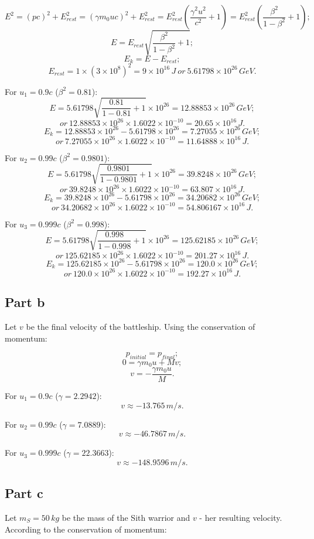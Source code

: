 \documentclass{article}
\begin{document}
\[
E^2 = (pc)^2 + E_{rest}^2 = (\gamma m_0uc)^2 + E_{rest}^2 = E_{rest}^2 (\frac{\gamma ^2 u^2}{c^2} + 1) = E_{rest}^2(\frac{\beta ^2}{1 - \beta ^2} + 1);
\]
\[
E = E_{rest} \sqrt{\frac{\beta ^2}{1 - \beta ^2} + 1};
\]
\[
E_k = E - E_{rest};
\]
\[
E_{rest} = 1 \times (3 \times 10^8)^2 = 9 \times 10^{16}\,J\:or\:5.61798\times10^{26}\,GeV.
\]

For $u_1 = 0.9c$ ($\beta^2 = 0.81$):
\[
E = 5.61798 \sqrt{\frac{0.81}{1-0.81} + 1} \times 10^{26} = 12.88853\times10^{26}\,GeV;
\]
\[
or\:12.88853\times10^{26} \times 1.6022 \times 10^{-10} = 20.65\times10^{16}\,J.
\]
\[
E_k = 12.88853\times10^{26} - 5.61798\times10^{26} = 7.27055\times10^{26}\,GeV;
\]
\[
or\:7.27055\times10^{26} \times 1.6022 \times 10^{-10} = 11.64888\times10^{16}\,J.
\]

For $u_2 = 0.99c$ ($\beta^2 = 0.9801$):
\[
E = 5.61798 \sqrt{\frac{0.9801}{1-0.9801} + 1} \times 10^{26} = 39.8248\times10^{26}\,GeV;
\]
\[
or\:39.8248\times10^{26} \times 1.6022 \times 10^{-10} = 63.807\times10^{16}\,J.
\]
\[
E_k = 39.8248\times10^{26} - 5.61798\times10^{26} = 34.20682\times10^{26}\,GeV;
\]
\[
or\:34.20682\times10^{26} \times 1.6022 \times 10^{-10} = 54.806167\times10^{16}\,J.
\]

For $u_3 = 0.999c$ ($\beta^2 = 0.998$):
\[
E = 5.61798 \sqrt{\frac{0.998}{1-0.998} + 1} \times 10^{26} = 125.62185\times10^{26}\,GeV;
\]
\[
or\:125.62185\times10^{26} \times 1.6022 \times 10^{-10} = 201.27\times10^{16}\,J.
\]
\[
E_k = 125.62185\times10^{26} - 5.61798\times10^{26} = 120.0\times10^{26}\,GeV;
\]
\[
or\:120.0\times10^{26} \times 1.6022 \times 10^{-10} = 192.27\times10^{16}\,J.
\]

\subsection*{Part b}
Let $v$ be the final velocity of the battleship. Using the conservation of momentum:

\[
p_{initial} = p_{final};
\]
\[
0 = \gamma m_0u + Mv;
\]
\[
v = - \frac{\gamma m_0u}{M}.
\]

For $u_1 = 0.9c$ ($\gamma = 2.2942$):
\[
v \approx -13.765\,m/s.
\]

For $u_2 = 0.99c$ ($\gamma = 7.0889$):
\[
v \approx -46.7867\,m/s.
\]

For $u_3 = 0.999c$ ($\gamma = 22.3663$):
\[
v \approx -148.9596\,m/s.
\]

\subsection*{Part c}
Let $m_S = 50\,kg$ be the mass of the Sith warrior and $v$ - her resulting velocity. According to the conservation of momentum:
\end{document}
